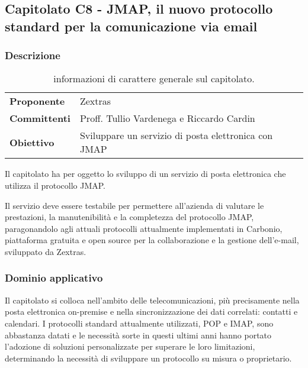 \subsection{Capitolato C8 - JMAP, il nuovo protocollo standard per la comunicazione via email} \label{sec:c8}
	\subsubsection{Descrizione}
	
		\begin{table}[H]
			\begin{tabularx}{\textwidth}{p{3cm}|X}
				\toprule
				\textbf{Proponente} & Zextras
				\\
				\textbf{Committenti} & Proff. Tullio Vardenega e Riccardo Cardin
				\\
				\textbf{Obiettivo} & Sviluppare un servizio di posta elettronica con JMAP
				\\\toprule
			\end{tabularx}
			\caption{informazioni di carattere generale sul capitolato.}
		\end{table}
		
		Il capitolato ha per oggetto lo sviluppo di un servizio di posta elettronica che utilizza il protocollo JMAP.
		
		Il servizio deve essere testabile per permettere all'azienda di valutare le prestazioni, la manutenibilità e la completezza del protocollo JMAP, paragonandolo agli attuali protocolli attualmente implementati in Carbonio, piattaforma gratuita e open source per la collaborazione e la gestione dell'e-mail, sviluppato da Zextras.
		
	\subsubsection{Dominio applicativo}
		Il capitolato si colloca nell'ambito delle telecomunicazioni, più precisamente nella posta elettronica on-premise e nella sincronizzazione dei dati correlati: contatti e calendari. I protocolli standard attualmente utilizzati, POP e IMAP, sono abbastanza datati e le necessità sorte in questi ultimi anni hanno portato l'adozione di soluzioni personalizzate per superare le loro limitazioni, determinando la necessità di sviluppare un protocollo su misura o proprietario.
		
